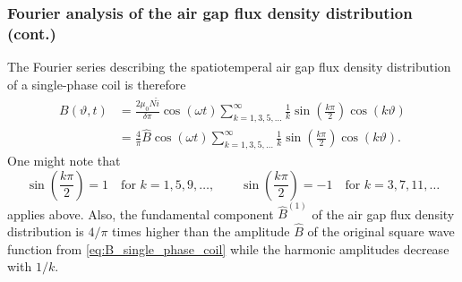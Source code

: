 \begin{frame}
	\frametitle{Fourier analysis of the air gap flux density distribution (cont.)}
        The Fourier series describing the spatiotemperal air gap flux density distribution of a single-phase coil is therefore
    \begin{equation}
        \begin{split}
            B(\vartheta, t) &= \frac{2 \mu_0 N \hat{i}}{\delta \pi}\cos(\omega t)\sum_{k=1,3,5,\ldots}^{\infty}   \frac{1}{k}\sin(\frac{k \pi}{2}) \cos(k \vartheta)\\ &= \frac{4}{\pi} \hat{B} \cos(\omega t)\sum_{k=1,3,5,\ldots}^{\infty}   \frac{1}{k}\sin(\frac{k \pi}{2}) \cos(k \vartheta).
        \end{split}
    \end{equation}
    One might note that $$\sin(\frac{k \pi}{2}) = 1 \quad \mbox{for } k=1,5,9,\ldots, \qquad \sin(\frac{k \pi}{2}) = -1 \quad \mbox{for } k=3,7,11,\ldots$$ applies above.  Also, the fundamental component $\hat{B}^{(1)}$ of the air gap flux density distribution is $4/\pi$ times higher than the amplitude $\hat{B}$ of the original square wave function from \eqref{eq:B_single_phase_coil} while the harmonic amplitudes decrease with $1/k$. 
\end{frame}

